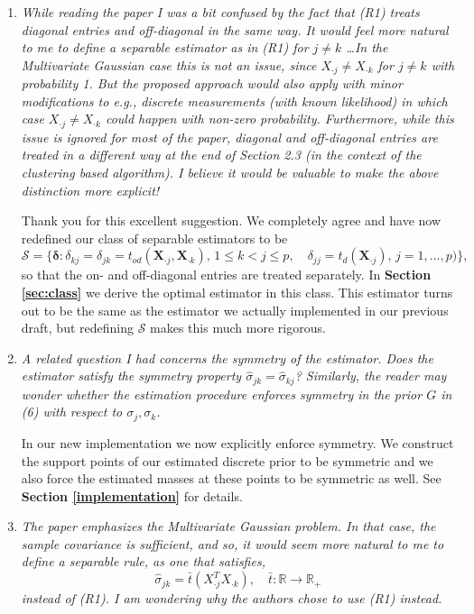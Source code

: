 \documentclass[12pt]{article}
\def\bs{\boldsymbol}
\def\bb{\mathbb}
\begin{document}
\begin{enumerate}
\item \emph{While reading the paper I was a bit confused by the fact that (R1) treats diagonal entries and off-diagonal in the same way. It would feel more natural to me to define a separable estimator as in (R1) for $j\neq k$ \ldots In the Multivariate Gaussian case this is not an issue, since $X_{\cdot j}\neq X_{\cdot k}$ for $j\neq k$ with probability 1. But the proposed approach would also apply with minor modifications to e.g., discrete measurements (with known likelihood) in which case $X_{\cdot j}\neq X_{\cdot k}$ could happen with non-zero probability. Furthermore, while this issue is ignored for most of the paper, diagonal and off-diagonal entries are treated in a different way at the end of Section 2.3 (in the context of the clustering based algorithm). I believe it would be valuable to make the above distinction more explicit!}

  Thank you for this excellent suggestion. We completely agree and have now redefined our class of separable estimators to be
  \[
  \mathcal{S} = \{\bs{\delta} : \delta_{kj} = \delta_{jk} = t_{od}(\bs{X}_{\cdot j}, \bs{X}_{\cdot k}),\, 1\leq k<j\leq p,\quad 
   \delta_{jj} = t_d(\bs{X}_{\cdot j}),\,j=1,\ldots,p)\},
 \]
 so that the on- and off-diagonal entries are treated separately. In \textbf{Section \ref{sec:class}} we derive the optimal estimator in this class. This estimator turns out to be the same as the estimator we actually implemented in our previous draft, but redefining $\mathcal{S}$ makes this much more rigorous.

\item \emph{A related question I had concerns the symmetry of the estimator. Does the estimator satisfy the symmetry property $\hat{\sigma}_{jk} =\hat{\sigma}_{kj}$? Similarly, the reader may wonder whether the estimation procedure enforces symmetry in the prior $G$ in (6) with respect to $\sigma_j,\sigma_k$.}

  In our new implementation we now explicitly enforce symmetry. We construct the support points of our estimated discrete prior to be symmetric and we also force the estimated masses at these points to be symmetric as well. See \textbf{Section \ref{implementation}} for details.
  
\item \emph{The paper emphasizes the Multivariate Gaussian problem. In that case, the sample covariance is sufficient, and so, it would seem more natural to me to define a separable rule, as one that satisfies,
$$\hat{\sigma}_{jk} = \bar{t}(X_{\cdot j}^TX_{\cdot k}),\quad \bar{t}: \bb{R}\to \bb{R}_{+}$$
instead of (R1). I am wondering why the authors chose to use (R1) instead.}


\end{enumerate}
\end{document}
